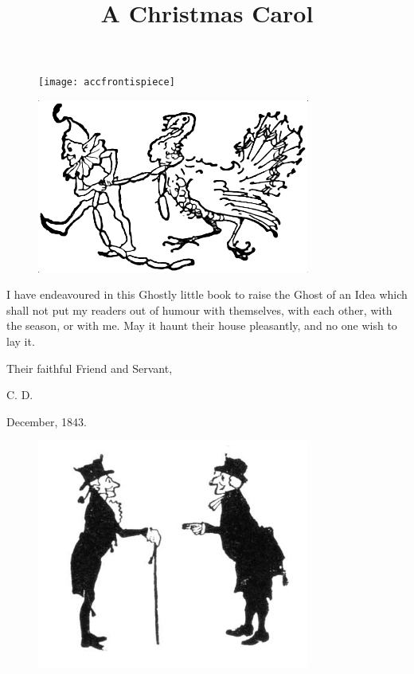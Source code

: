 \documentclass[paper=5.5in:8.5in,BCOR=10mm,twoside,DIV=15,12pt,usegeometry,openany]{scrbook} %
\begin{document}
\renewcommand*{\sectionmarkformat}{}
\renewcommand*\raggedchapter{\centering}
\pagestyle{empty}
\begin{figure}[p]
\begin{minipage}[c]{\linewidth}
\texttt{[image: accfrontispiece]}
\end{minipage}
\end{figure}
\title{A Christmas Carol}



\renewcommand*{\chapterpagestyle}{empty}
\tableofcontents
\begin{figure}
\centering
\includegraphics[width=0.8\textwidth]{elfturkey}
\end{figure}
\clearpage
\pagestyle{headings}
\renewcommand*{\chapterpagestyle}{plain}

\lettrine[loversize=.85]{I}{} have endeavoured in this Ghostly little book to raise the Ghost of an Idea which shall not put my readers out of humour with themselves, with each other, with the season, or with me. May it haunt their house pleasantly, and no one wish to lay it.

Their faithful Friend and Servant,

C. D.

December, 1843.
\begin{figure}[h]
\centering
\includegraphics[width=0.8\textwidth]{gs007}
\end{figure}
\end{document}
